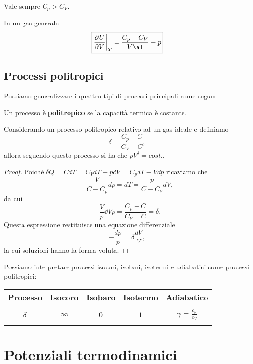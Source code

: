 \begin{remark}\label{DisguguaglianzaCapacitaTermiche}
Vale sempre $C_p>C_V$.
\end{remark}

\begin{remark}\label{DerivataEnergiaInternaRispettoAlVolume}
In un gas generale
\[\boxed{\ppb VUT=\frac{C_p-C_V}{V\al}-p}\]
\end{remark}

\subsection{Processi politropici}
Possiamo generalizzare i quattro tipi di processi principali come segue:
\begin{definition}
Un processo \`e \textbf{politropico} se la capacit\`a termica \`e costante.
\end{definition}

\begin{proposition}\label{CurveProcessiPolitropici}
Considerando un processo politropico relativo ad un gas ideale e definiamo
\[\delta=\frac{C_p-C}{C_V-C},\]
allora seguendo questo processo si ha che $pV^\delta=cost.$.
\end{proposition}
\begin{proof}
Poich\'e $\delta Q=CdT=C_VdT+pdV=C_pdT-Vdp$ ricaviamo che
\[-\frac V{C-C_p}dp=dT=\frac p{C-C_V}dV,\]
da cui
\[-\frac Vp\dd Vp=\frac{C_p-C}{C_V-C}=\delta.\]
Questa espressione restituisce una equazione differenziale
\[-\frac{dp}p=\delta\frac{dV}V,\]
la cui soluzioni hanno la forma voluta.
\end{proof}

\noindent
Possiamo interpretare processi isocori, isobari, isotermi e adiabatici come processi politropici:
\begin{center}
\begin{tabular}[ht]{|c||c|c|c|c|}
\hline
Processo & Isocoro & Isobaro & Isotermo & Adiabatico\\\hline&&&&\\
$\delta$ & $\infty$ & $0$ & $1$ & $\displaystyle\gamma=\frac{c_p}{c_V}$\\ &&&&\\\hline
\end{tabular}
\end{center}



\section{Potenziali termodinamici}
